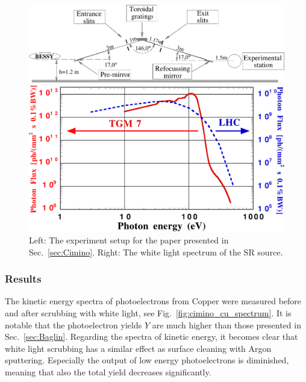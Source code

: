 \begin{figure}[tbh]
    \centering
    \begin{minipage}[c]{0.65\textwidth}
    	\includegraphics[width=1\textwidth]{../ss/cimino_setup.png}
    \end{minipage}
    \hspace{0.5cm}
    \begin{minipage}[c]{0.30\textwidth}
    	\includegraphics[width=1.0\textwidth]{../ss/cimino_wl_spectrum.png}
    \end{minipage}
    \caption{Left: The experiment setup for the paper presented in Sec.~\ref{sec:Cimino}. Right: The white light spectrum of the SR source.}
    \label{fig:cimino_setup}
\end{figure}


\subsubsection{Results}

The kinetic energy spectra of photoelectrons from Copper were measured before and after scrubbing with white light, see Fig.~\ref{fig:cimino_cu_spectrum}.
It is notable that the photoelectron yields $Y$ are much higher than those presented in Sec.~\ref{sec:Baglin}.
Regarding the spectra of kinetic energy, it becomes clear that white light scrubbing has a similar effect as surface cleaning with Argon sputtering.
Especially the output of low energy photoelectrons is diminished, meaning that also the total yield decreases significantly.

